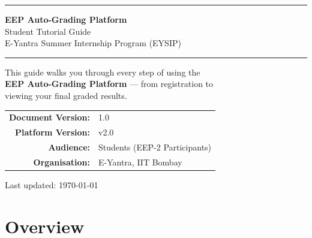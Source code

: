 \documentclass[12pt,a4paper]{article}
\begin{document}

\begin{titlepage}
  \centering
  \vspace*{2cm}

  {\color{eyantraBlue}\rule{\linewidth}{3pt}}
  \vspace{0.5cm}

  {\Huge\bfseries\color{eyantraBlue} EEP Auto-Grading Platform}\\[0.6em]
  {\LARGE\color{eyantraAccent} Student Tutorial Guide}\\[0.4em]
  {\large\color{darkgray} E-Yantra Summer Internship Program (EYSIP)}

  \vspace{0.5cm}
  {\color{eyantraBlue}\rule{\linewidth}{3pt}}

  \vspace{1.5cm}

  \begin{tcolorbox}[colback=lightgray, colframe=eyantraAccent, width=0.8\linewidth]
    \centering
    \large This guide walks you through every step of using the\\
    \textbf{EEP Auto-Grading Platform} — from registration to\\
    viewing your final graded results.
  \end{tcolorbox}

  \vfill

  \begin{tabular}{rl}
    \textbf{Document Version:} & 1.0 \\
    \textbf{Platform Version:} & v2.0 \\
    \textbf{Audience:}         & Students (EEP-2 Participants) \\
    \textbf{Organisation:}     & E-Yantra, IIT Bombay \\
  \end{tabular}

  \vspace{1cm}
  {\color{darkgray}\small Last updated: \today}
\end{titlepage}

\tableofcontents
\newpage

\section{Overview}
\end{document}
